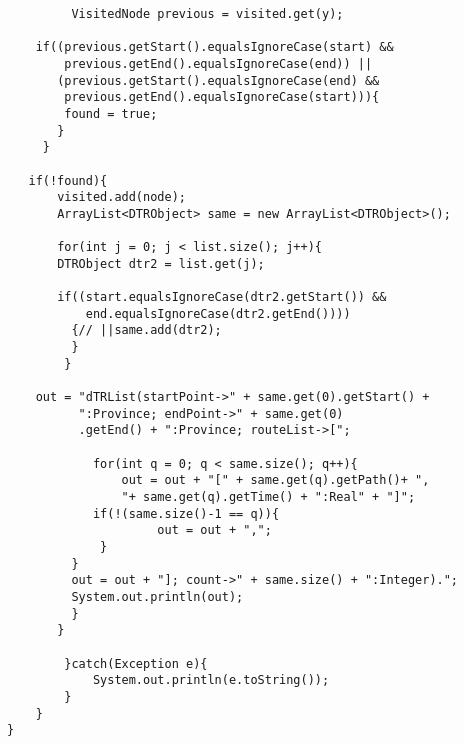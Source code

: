 \begin{verbatim}
         VisitedNode previous = visited.get(y);
        		  		  
    if((previous.getStart().equalsIgnoreCase(start) && 
        previous.getEnd().equalsIgnoreCase(end)) ||
       (previous.getStart().equalsIgnoreCase(end) && 
        previous.getEnd().equalsIgnoreCase(start))){
        found = true;
       }
     }

   if(!found){
       visited.add(node);
       ArrayList<DTRObject> same = new ArrayList<DTRObject>();
               		 
       for(int j = 0; j < list.size(); j++){
       DTRObject dtr2 = list.get(j);

       if((start.equalsIgnoreCase(dtr2.getStart()) && 
           end.equalsIgnoreCase(dtr2.getEnd()))) 
         {// ||same.add(dtr2);        				 
         }		 
        }
        		
   	out = "dTRList(startPoint->" + same.get(0).getStart() + 
   	      ":Province; endPoint->" + same.get(0)
          .getEnd() + ":Province; routeList->[";
            	 
        	for(int q = 0; q < same.size(); q++){
       		    out = out + "[" + same.get(q).getPath()+ ",
       		    "+ same.get(q).getTime() + ":Real" + "]";
       		if(!(same.size()-1 == q)){
        			 out = out + ",";
      		 }
       	 }
       	 out = out + "]; count->" + same.size() + ":Integer).";
      	 System.out.println(out);
      	 }      	      	 
       }        
         
		}catch(Exception e){
			System.out.println(e.toString());
		}
	}
}

\end{verbatim}

